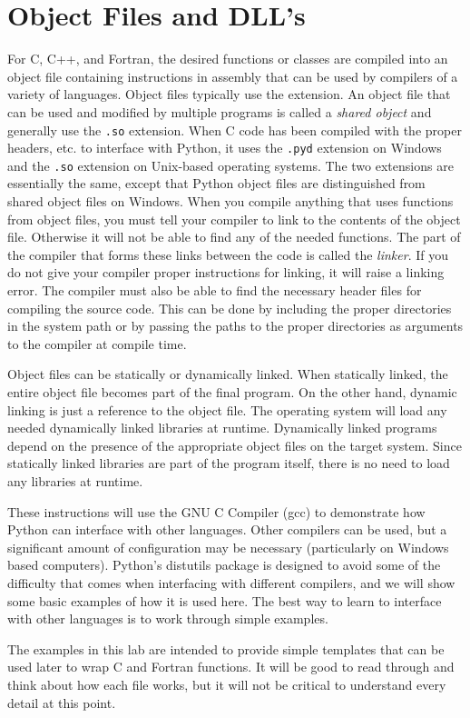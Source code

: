 \section*{Object Files and DLL's}
For C, C++, and Fortran, the desired functions or classes are compiled into an object file containing instructions in assembly that can be used by compilers of a variety of languages.
Object files typically use the \of extension.
An object file that can be used and modified by multiple programs is called a \emph{shared object} and generally use the \texttt{.so} extension.
When C code has been compiled with the proper headers, etc. to interface with Python, it uses the \texttt{.pyd} extension on Windows and the \texttt{.so} extension on Unix-based operating systems.
The two extensions are essentially the same, except that Python object files are distinguished from shared object files on Windows.
When you compile anything that uses functions from object files, you must tell your compiler to link to the contents of the object file.
Otherwise it will not be able to find any of the needed functions.
The part of the compiler that forms these links between the code is called the \emph{linker}.
If you do not give your compiler proper instructions for linking, it will raise a linking error.
The compiler must also be able to find the necessary header files for compiling the source code.
This can be done by including the proper directories in the system path or by passing the paths to the proper directories as arguments to the compiler at compile time.

Object files can be statically or dynamically linked.
When statically linked, the entire object file becomes part of the final program.
On the other hand, dynamic linking is just a reference to the object file.
The operating system will load any needed dynamically linked libraries at runtime.
Dynamically linked programs depend on the presence of the appropriate object files on the target system.
Since statically linked libraries are part of the program itself, there is no need to load any libraries at runtime.

These instructions will use the GNU C Compiler (gcc) to demonstrate how Python can interface with other languages.
Other compilers can be used, but a significant amount of configuration may be necessary (particularly on Windows based computers).
Python's distutils package is designed to avoid some of the difficulty that comes when interfacing with different compilers, and we will show some basic examples of how it is used here.
The best way to learn to interface with other languages is to work through simple examples.
\begin{info}
The examples in this lab are intended to provide simple templates that can be used later to wrap C and Fortran functions.
It will be good to read through and think about how each file works, but it will not be critical to understand every detail at this point.
\end{info}

